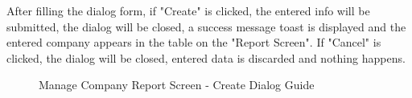 After filling the dialog form, if "Create" is clicked, the entered info will be submitted, the dialog will be closed, a success message toast is displayed and the entered company appears in the table on the "Report Screen". If "Cancel" is clicked, the dialog will be closed, entered data is discarded and nothing happens.

\begin{figure}[H]
	\centering
    \hspace{5pt}
    \vspace{10pt}
    \caption{Manage Company Report Screen - Create Dialog Guide}
	\label{fig:MCreportCreateStep12}
\end{figure}

